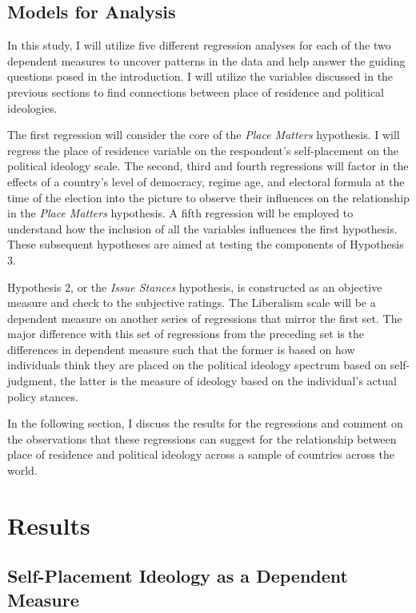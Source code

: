 \documentclass[12pt, titlepage]{article}
\newcommand\e{\emph}
\begin{document}
\subsection{Models for Analysis}

In this study, I will utilize five different regression analyses for each of the two dependent measures to uncover patterns in the data and help answer the guiding questions posed in the introduction. I will utilize the variables discussed in the previous sections to find connections between place of residence and political ideologies.

The first regression will consider the core of the \e{Place Matters} hypothesis. I will regress the place of residence variable on the respondent's self-placement on the political ideology scale. The second, third and fourth regressions will factor in the effects of a country's level of democracy, regime age, and electoral formula at the time of the election into the picture to observe their influences on the relationship in the \e{Place Matters} hypothesis. A fifth regression will be employed to understand how the inclusion of all the variables influences the first hypothesis. These subsequent hypotheses are aimed at testing the components of Hypothesis 3.

Hypothesis 2, or the \e{Issue Stances} hypothesis, is constructed as an objective measure and check to the subjective ratings. The Liberalism scale will be a dependent measure on another series of regressions that mirror the first set. The major difference with this set of regressions from the preceding set is the differences in dependent measure such that the former is based on how individuals think they are placed on the political ideology spectrum based on self-judgment, the latter is the measure of ideology based on the individual's actual policy stances.

In the following section, I discuss the results for the regressions and comment on the observations that these regressions can suggest for the relationship between place of residence and political ideology across a sample of countries across the world.

\section{Results}


\subsection{Self-Placement Ideology as a Dependent Measure}
\end{document}
